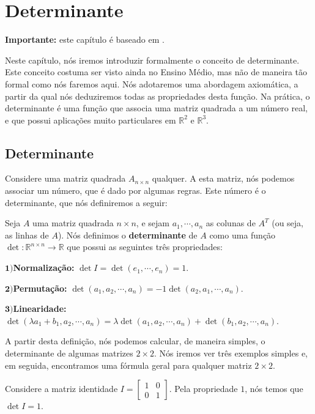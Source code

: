 \chapter{Determinante}
\label{cap:determinante}

\textbf{Importante:} este capítulo é baseado em \cite{slide6doyuri}.

Neste capítulo, nós iremos introduzir formalmente o conceito de determinante. Este conceito costuma ser visto ainda no Ensino Médio, mas não de maneira tão formal como nós faremos aqui. Nós adotaremos uma abordagem axiomática, a partir da qual nós deduziremos todas as propriedades desta função. Na prática, o determinante é uma função que associa uma matriz quadrada a um número real, e que possui aplicações muito particulares em $\mathbb{R}^2$ e $\mathbb{R}^3$.

\section{Determinante}

Considere uma matriz quadrada $A_{n\times n}$ qualquer. A esta matriz, nós podemos associar um número, que é dado por algumas regras. Este número é o determinante, que nós definiremos a seguir:

\begin{Definition}[Determinante]
	Seja $A$ uma matriz quadrada $n\times n$, e sejam $a_1, \cdots, a_n$ as colunas de $A^T$ (ou seja, as linhas de $A$). Nós definimos o \textbf{determinante} de $A$ como uma função $\det:\mathbb{R}^{n\times n}\to\mathbb{R}$ que possui as seguintes três propriedades:
	
	$\mathbf{1)}$\textbf{Normalização:} $\det I = \det(e_1, \cdots, e_n) = 1$.
	
	$\mathbf{2)}$\textbf{Permutação:} $\det(a_1, a_2, \cdots, a_n) = -1\det(a_2, a_1, \cdots, a_n)$.
	
	$\mathbf{3)}$\textbf{Linearidade:} $\det(\lambda a_1 + b_1, a_2, \cdots, a_n) = \lambda\det(a_1, a_2, \cdots, a_n) + \det(b_1, a_2, \cdots, a_n)$.
\end{Definition}

A partir desta definição, nós podemos calcular, de maneira simples, o determinante de algumas matrizes $2\times 2$. Nós iremos ver três exemplos simples e, em seguida, encontramos uma fórmula geral para qualquer matriz $2\times 2$.

\begin{Example}
	Considere a matriz identidade $I = \begin{bmatrix}
		1 & 0 \\
		0 & 1
	\end{bmatrix}$. Pela propriedade $1$, nós temos que $\det I = 1$.
\end{Example}

